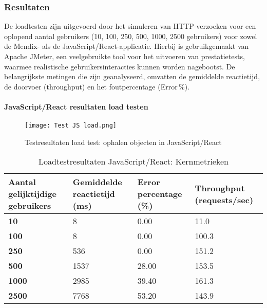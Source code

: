\subsubsection{Resultaten}
De loadtesten zijn uitgevoerd door het simuleren van HTTP-verzoeken voor een oplopend aantal gebruikers (10, 100, 250, 500, 1000, 2500 gebruikers) voor zowel de Mendix- als de JavaScript/React-applicatie. Hierbij is gebruikgemaakt van Apache JMeter, een veelgebruikte tool voor het uitvoeren van prestatietests, waarmee realistische gebruikersinteracties kunnen worden nagebootst. De belangrijkste metingen die zijn geanalyseerd, omvatten de gemiddelde reactietijd, de doorvoer (throughput) en het foutpercentage (Error \%).

\paragraph{JavaScript/React resultaten load testen}

\begin{figure}[H]
    \centering
    \captionsetup{justification=centering}
    \texttt{[image: Test JS load.png]}
    \caption[\centering Testresultaten load test: ophalen objecten in JavaScript/React]{\label{fig:loadtest-JavaScript} Testresultaten load test: ophalen objecten in JavaScript/React}
\end{figure}


\begin{table}[h]
    \centering
    \begin{tabular}{ |p{5cm}|p{3cm}|p{3cm}|p{3cm}|}
        \hline
        \textbf{Aantal gelijktijdige \newline gebruikers} & \textbf{Gemiddelde reactietijd (ms)} & \textbf{Error \newline percentage (\%)} & \textbf{Throughput (requests/sec)}\\
        \hline
        \textbf{10}  & 8 & 0.00 & 11.0 \\
        \hline
        \textbf{100} & 8 & 0.00 & 100.3 \\
        \hline
        \textbf{250}  & 536 & 0.00 & 151.2 \\
        \hline
        \textbf{500}  & 1537 & 28.00 & 153.5 \\
        \hline                       
        \textbf{1000}  & 2985 & 39.40 & 161.3  \\
        \hline
        \textbf{2500}  & 7768 & 53.20 & 143.9 \\
        \hline
    \end{tabular}
    \caption[\centering Loadtestresultaten JavaScript/React: Kernmetrieken]{\label{tab:Testresultaten JS loadtest}Loadtestresultaten JavaScript/React: Kernmetrieken}
\end{table}


